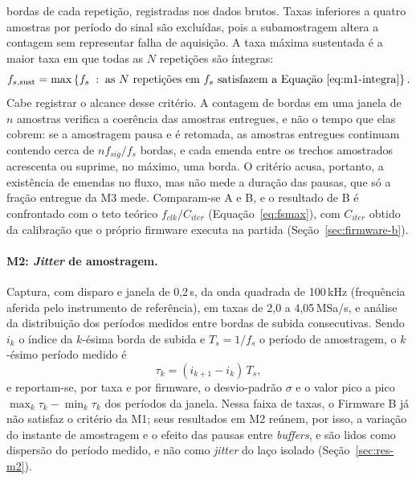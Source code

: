 bordas de cada repetição, registradas nos dados brutos.
Taxas inferiores a
quatro amostras por período do sinal são excluídas, pois a subamostragem altera
a contagem sem representar falha de aquisição. A taxa máxima sustentada é a
maior taxa em que todas as $N$ repetições são íntegras:
\begin{equation}\label{eq:m1-fmax}
  f_{s,\mathrm{sust}} = \max \left\{ f_s \;:\; \text{as } N \text{ repetições em } f_s \text{ satisfazem a Equação~\ref{eq:m1-integra}} \right\}.
\end{equation}
Cabe registrar o alcance desse critério. A contagem de bordas em uma janela
de $n$ amostras verifica a coerência das amostras entregues, e não o tempo
que elas cobrem: se a amostragem pausa e é retomada, as amostras entregues
continuam contendo cerca de $n f_{sig}/f_s$ bordas, e cada emenda entre os
trechos amostrados acrescenta ou suprime, no máximo, uma borda. O critério
acusa, portanto, a existência de emendas no fluxo, mas não mede a duração das
pausas, que só a fração entregue da M3 mede. Comparam-se A e B, e o resultado de B é confrontado com o teto teórico
$f_{clk}/C_{iter}$ (Equação~\ref{eq:fsmax}), com $C_{iter}$ obtido da
calibração que o próprio firmware executa na partida
(Seção~\ref{sec:firmware-b}).

\paragraph{M2: \emph{Jitter} de amostragem.} Captura, com disparo e janela de 0,2\,s, da onda quadrada de
100\,kHz (frequência aferida pelo instrumento de referência), em taxas de 2,0 a
4,05\,MSa/s, e análise da distribuição dos períodos medidos entre bordas de
subida consecutivas. Sendo $i_k$ o índice da $k$-ésima borda de subida e
$T_s = 1/f_s$ o período de amostragem, o $k$-ésimo período medido é
\begin{equation}\label{eq:m2-periodo}
  \tau_k = (i_{k+1} - i_k)\, T_s ,
\end{equation}
e reportam-se, por taxa e por firmware, o desvio-padrão $\sigma$ e o valor
pico a pico $\max_k \tau_k - \min_k \tau_k$ dos períodos da janela. Nessa
faixa de taxas, o Firmware B já não satisfaz o critério da M1; seus resultados
em M2 reúnem, por isso, a variação do instante de amostragem e o efeito das
pausas entre \emph{buffers}, e são lidos como dispersão do período medido, e
não como \emph{jitter} do laço isolado (Seção~\ref{sec:res-m2}).

